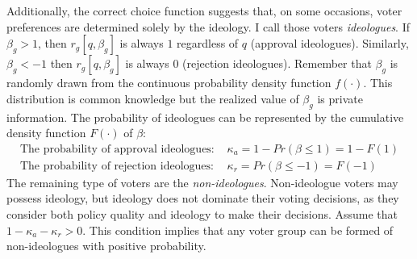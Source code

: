 \documentclass[doc,natbib,12pt]{apa6}
\begin{document}
	\par Additionally, the correct choice function suggests that, on some occasions, voter preferences are determined solely by the ideology. I call those voters \textit{ideologues}. If $\beta_g > 1$, then $r_g[q, \beta_g]$ is always $1$ regardless of $q$ (approval ideologues). Similarly, $\beta_g < -1$ then $r_g[q, \beta_g]$ is always $0$ (rejection ideologues). Remember that $\beta_g$ is randomly drawn from the continuous probability density function $f(\cdot)$. This distribution is common knowledge but the realized value of $\beta_g$ is private information. The probability of ideologues can be represented by the cumulative density function $F(\cdot)$ of $\beta$:
	\begin{align}
	\text{The probability of approval ideologues: } &\kappa_{a} = 1 - Pr(\beta \leq 1) = 1 - F(1)   \\
	\text{The probability of rejection ideologues: } &\kappa_{r} = Pr(\beta \leq -1) = F(-1)   
	\end{align}
	\noindent The remaining type of voters are the \textit{non-ideologues}. Non-ideologue voters may possess ideology, but ideology does not dominate their voting decisions, as they consider both policy quality and ideology to make their decisions. Assume that $1-\kappa_{a} - \kappa_{r} >0$. This condition implies that any voter group can be formed of non-ideologues with positive probability.
	
\end{document}
